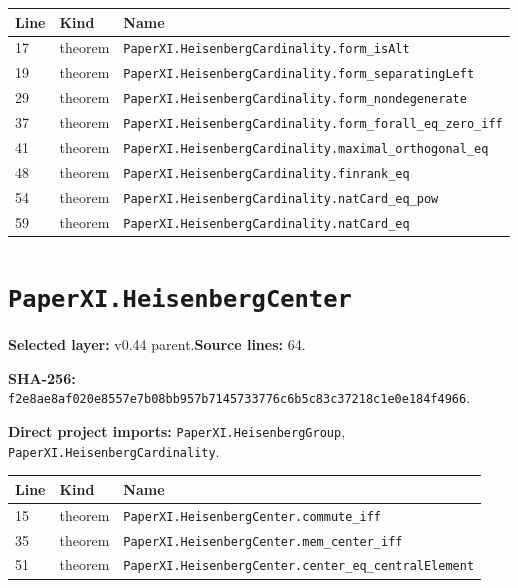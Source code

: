 \documentclass[10pt,oneside]{book}
\begin{document}
\begin{longtable}{@{}p{}p{}p{}@{}}\toprule Line&Kind&Name\\\midrule\endhead

17&theorem&\nolinkurl{PaperXI.HeisenbergCardinality.form_isAlt}\\

19&theorem&\nolinkurl{PaperXI.HeisenbergCardinality.form_separatingLeft}\\

29&theorem&\nolinkurl{PaperXI.HeisenbergCardinality.form_nondegenerate}\\

37&theorem&\nolinkurl{PaperXI.HeisenbergCardinality.form_forall_eq_zero_iff}\\

41&theorem&\nolinkurl{PaperXI.HeisenbergCardinality.maximal_orthogonal_eq}\\

48&theorem&\nolinkurl{PaperXI.HeisenbergCardinality.finrank_eq}\\

54&theorem&\nolinkurl{PaperXI.HeisenbergCardinality.natCard_eq_pow}\\

59&theorem&\nolinkurl{PaperXI.HeisenbergCardinality.natCard_eq}\\

\bottomrule\end{longtable}

\section{\texorpdfstring{\nolinkurl{PaperXI.HeisenbergCenter}}{PaperXI.HeisenbergCenter}}\label{module:PaperXI.HeisenbergCenter}

\textbf{Selected layer:} v0.44 parent.\quad\textbf{Source lines:} 64.\par\textbf{SHA-256:} {\scriptsize\nolinkurl{f2e8ae8af020e8557e7b08bb957b7145733776c6b5c83c37218c1e0e184f4966}}.


\textbf{Direct project imports:} \nolinkurl{PaperXI.HeisenbergGroup}, \nolinkurl{PaperXI.HeisenbergCardinality}.

\begin{longtable}{@{}p{}p{}p{}@{}}\toprule Line&Kind&Name\\\midrule\endhead

15&theorem&\nolinkurl{PaperXI.HeisenbergCenter.commute_iff}\\

35&theorem&\nolinkurl{PaperXI.HeisenbergCenter.mem_center_iff}\\

51&theorem&\nolinkurl{PaperXI.HeisenbergCenter.center_eq_centralElement}\\

\bottomrule\end{longtable}
\end{document}
